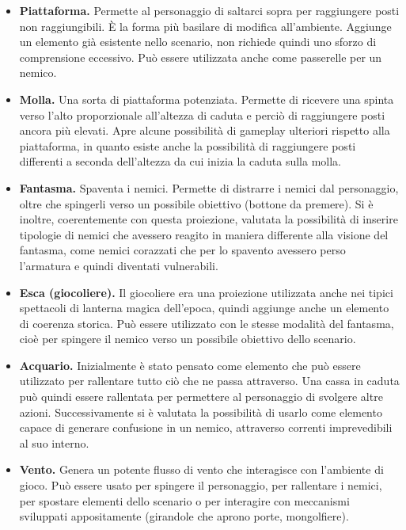 \begin{itemize}
	\item \textbf{Piattaforma.} Permette al personaggio di saltarci sopra per raggiungere posti non raggiungibili. È la forma più basilare di modifica all’ambiente. Aggiunge un elemento già esistente nello scenario, non richiede quindi uno sforzo di comprensione eccessivo. Può essere utilizzata anche come passerelle per un nemico.
	
	\item \textbf{Molla.} Una sorta di piattaforma potenziata. Permette di ricevere una spinta verso l’alto proporzionale all’altezza di caduta e perciò di raggiungere posti ancora più elevati. Apre alcune possibilità di gameplay ulteriori rispetto alla piattaforma, in quanto esiste anche la possibilità di raggiungere posti differenti a seconda dell’altezza da cui inizia la caduta sulla molla.
	
	\item \textbf{Fantasma.} Spaventa i nemici. Permette di distrarre i nemici dal personaggio, oltre che spingerli verso un possibile obiettivo (bottone da premere). Si è inoltre, coerentemente con questa proiezione, valutata la possibilità di inserire tipologie di nemici che avessero reagito in maniera differente alla visione del fantasma, come nemici corazzati che per lo spavento avessero perso l’armatura e quindi diventati vulnerabili.
	
	\item \textbf{Esca (giocoliere).} Il giocoliere era una proiezione utilizzata anche nei tipici spettacoli di lanterna magica dell’epoca, quindi aggiunge anche un elemento di coerenza storica. Può essere utilizzato con le stesse modalità del fantasma, cioè per spingere il nemico verso un possibile obiettivo dello scenario.
	
	\item \textbf{Acquario.} Inizialmente è stato pensato come elemento che può essere utilizzato per rallentare tutto ciò che ne passa attraverso. Una cassa in caduta può quindi essere rallentata per permettere al personaggio di svolgere altre azioni. Successivamente si è valutata la possibilità di usarlo come elemento capace di generare confusione in un nemico, attraverso correnti imprevedibili al suo interno.
	
	\item \textbf{Vento.} Genera un potente flusso di vento che interagisce con l’ambiente di gioco. Può essere usato per spingere il personaggio, per rallentare i nemici, per spostare elementi dello scenario o per interagire con meccanismi sviluppati appositamente (girandole che aprono porte, mongolfiere).
	

\end{itemize}
